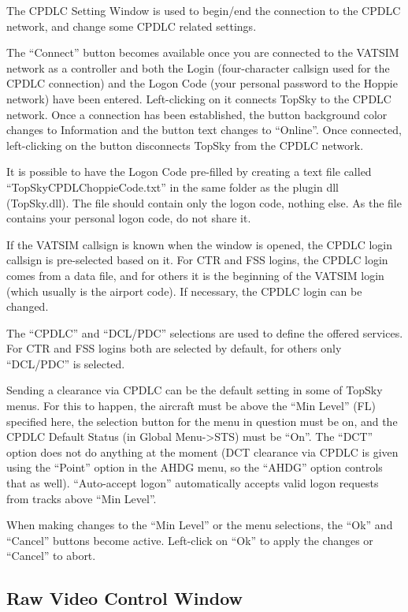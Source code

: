 \documentclass[11pt,a4paper]{memoir}
\newenvironment{Note}
  {\begin{shaded}\marginnote{\fbox{Note}}}
  {\end{shaded}}
\begin{document}
The CPDLC Setting Window is used to begin/end the connection to the CPDLC network, and change some CPDLC related settings.

The “Connect” button becomes available once you are connected to the VATSIM network as a controller and both the Login (four-character callsign used for the CPDLC connection) and the Logon Code (your personal password to the Hoppie network) have been entered. Left-clicking on it connects TopSky to the CPDLC network. Once a connection has been established, the button background color changes to Information and the button text changes to “Online”. Once connected, left-clicking on the button disconnects TopSky from the CPDLC network.

\begin{Note}
    It is possible to have the Logon Code pre-filled by creating a text file called “TopSkyCPDLChoppieCode.txt” in the same folder as the plugin dll (TopSky.dll). The file should contain only the logon code, nothing else. As the file contains your personal logon code, do not share it.
\end{Note}

If the VATSIM callsign is known when the window is opened, the CPDLC login callsign is pre-selected based on it. For CTR and FSS logins, the CPDLC login comes from a data file, and for others it is the beginning of the VATSIM login (which usually is the airport code). If necessary, the CPDLC login can be changed.

The “CPDLC” and “DCL/PDC” selections are used to define the offered services. For CTR and FSS logins both are selected by default, for others only “DCL/PDC” is selected.

Sending a clearance via CPDLC can be the default setting in some of TopSky menus. For this to happen, the aircraft must be above the “Min Level” (FL) specified here, the selection button for the menu in question must be on, and the CPDLC Default Status (in Global Menu->STS) must be “On”. The “DCT” option does not do anything at the moment (DCT clearance via CPDLC is given using the “Point” option in the AHDG menu, so the “AHDG” option controls that as well). “Auto-accept logon” automatically accepts valid logon requests from tracks above “Min Level”.

When making changes to the “Min Level” or the menu selections, the “Ok” and “Cancel” buttons become active. Left-click on “Ok” to apply the changes or “Cancel” to abort.

\subsection{Raw Video Control Window}
\label{win:rvcw}
\end{document}
